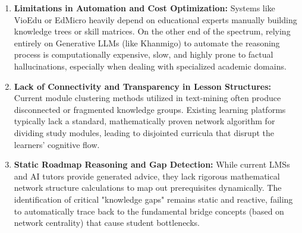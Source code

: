 \begin{enumerate}
    \item \textbf{Limitations in Automation and Cost Optimization:} Systems like VioEdu or EdMicro heavily depend on educational experts manually building knowledge trees or skill matrices. On the other end of the spectrum, relying entirely on Generative LLMs (like Khanmigo) to automate the reasoning process is computationally expensive, slow, and highly prone to factual hallucinations, especially when dealing with specialized academic domains.
    
    \item \textbf{Lack of Connectivity and Transparency in Lesson Structures:} Current module clustering methods utilized in text-mining often produce disconnected or fragmented knowledge groups. Existing learning platforms typically lack a standard, mathematically proven network algorithm for dividing study modules, leading to disjointed curricula that disrupt the learners' cognitive flow.
    
    \item \textbf{Static Roadmap Reasoning and Gap Detection:} While current LMSs and AI tutors provide generated advice, they lack rigorous mathematical network structure calculations to map out prerequisites dynamically. The identification of critical "knowledge gaps" remains static and reactive, failing to automatically trace back to the fundamental bridge concepts (based on network centrality) that cause student bottlenecks.
\end{enumerate}
